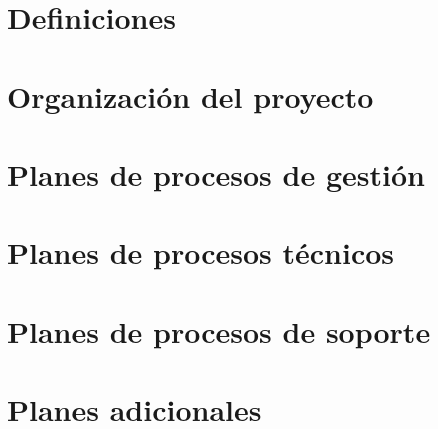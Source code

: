 \documentclass[a4paper,11pt,oneside]{report}
\begin{document}
\chapter{Definiciones}


\chapter{Organización del proyecto}


\chapter{Planes de procesos de gestión}


\chapter{Planes de procesos técnicos}


\chapter{Planes de procesos de soporte}


\chapter{Planes adicionales}

\end{document}
